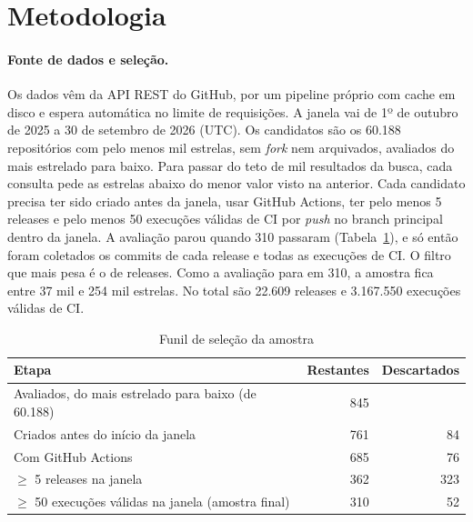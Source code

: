 \documentclass[12pt]{article}
\begin{document}
\section{Metodologia}

\paragraph{Fonte de dados e seleção.} Os dados vêm da API REST do GitHub, por um pipeline próprio
com cache em disco e espera automática no limite de requisições. A janela vai de 1º de outubro de
2025 a 30 de setembro de 2026 (UTC). Os candidatos são os 60.188 repositórios com pelo menos mil
estrelas, sem \textit{fork} nem arquivados, avaliados do mais estrelado para baixo. Para passar do
teto de mil resultados da busca, cada consulta pede as estrelas abaixo do menor valor visto na
anterior. Cada candidato precisa ter sido criado antes da janela, usar GitHub Actions, ter pelo menos
5 releases e pelo menos 50 execuções válidas de CI por \textit{push} no branch principal dentro da
janela. A avaliação parou quando 310 passaram (Tabela~\ref{tab:funil}), e só então foram coletados os
commits de cada release e todas as execuções de CI. O filtro que mais pesa é o de releases. Como a
avaliação para em 310, a amostra fica entre 37 mil e 254 mil estrelas. No total são 22.609 releases e
3.167.550 execuções válidas de CI.

\begin{table}[ht]
\centering
\caption{Funil de seleção da amostra}
\label{tab:funil}
\small
\begin{tabular}{lrr}
\hline
Etapa & Restantes & Descartados \\
\hline
Avaliados, do mais estrelado para baixo (de 60.188) & 845 & \\
Criados antes do início da janela & 761 & 84 \\
Com GitHub Actions & 685 & 76 \\
$\geq$ 5 releases na janela & 362 & 323 \\
$\geq$ 50 execuções válidas na janela (amostra final) & 310 & 52 \\
\hline
\end{tabular}
\end{table}
\end{document}
